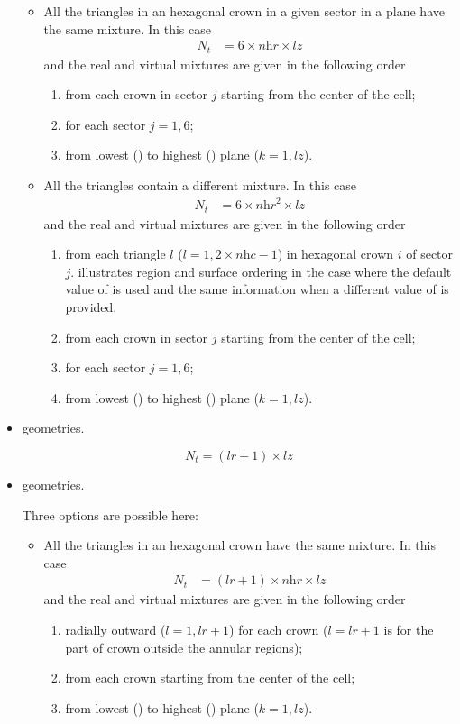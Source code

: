 \begin{itemize}
\begin{itemize}
\item All the triangles in an hexagonal crown in a given sector in a plane have the same mixture. In this case
\begin{align*}N_{t}&=6\times \textit{nhr}\times \textit{lz}\end{align*}
and the real and virtual mixtures are given in the following order 
\begin{enumerate}
\item from each crown in sector $j$ starting from the center of the cell;
\item for each sector $j=1,6$;
\item from lowest () to highest () plane ($k=1,\textit{lz}$).
\end{enumerate}

\item All the triangles contain a different mixture. In this case
\begin{align*}N_{t}&=6\times \textit{nhr}^{2}\times \textit{lz}\end{align*}
and the real and virtual mixtures are given in the following order 
\begin{enumerate}
\item from each triangle $l$ ($l=1,2\times \textit{nhc}-1$) in hexagonal crown $i$ of sector $j$.  illustrates region and surface ordering in the case where the default value of  is used and  the same information when a different value of  is provided.
\item from each crown in sector $j$ starting from the center of the cell;
\item for each sector $j=1,6$;
\item from lowest () to highest () plane ($k=1,\textit{lz}$).
\end{enumerate}
\end{itemize}


\item {} geometries.

$$N_{t}=(\textit{lr}+1)\times \textit{lz}$$

\item {} geometries.

Three options are possible here:
\begin{itemize}
\item All the triangles in an hexagonal crown have the same mixture. In this case
\begin{align*}N_{t}&=(\textit{lr}+1)\times \textit{nhr}\times \textit{lz}\end{align*}
and the real and virtual mixtures are given in the following order
\begin{enumerate}
\item radially outward ($l=1,\textit{lr}+1$) for each crown ($l=\textit{lr}+1$ is for the part of crown outside the annular regions);
\item from each crown starting from the center of the cell;
\item from lowest () to highest () plane ($k=1,\textit{lz}$).
\end{enumerate}


\end{itemize}
\end{itemize}
